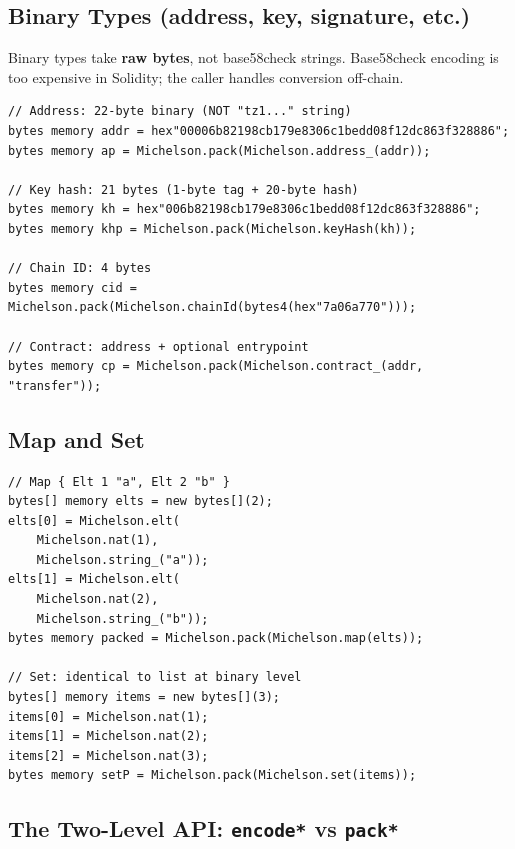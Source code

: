 \documentclass[11pt,a4paper]{article}
\begin{document}
\subsection{Binary Types (address, key, signature, etc.)}

Binary types take \textbf{raw bytes}, not base58check strings. Base58check
encoding is too expensive in Solidity; the caller handles conversion off-chain.

\begin{codebox}
\begin{lstlisting}[language=Solidity]
// Address: 22-byte binary (NOT "tz1..." string)
bytes memory addr = hex"00006b82198cb179e8306c1bedd08f12dc863f328886";
bytes memory ap = Michelson.pack(Michelson.address_(addr));

// Key hash: 21 bytes (1-byte tag + 20-byte hash)
bytes memory kh = hex"006b82198cb179e8306c1bedd08f12dc863f328886";
bytes memory khp = Michelson.pack(Michelson.keyHash(kh));

// Chain ID: 4 bytes
bytes memory cid = Michelson.pack(Michelson.chainId(bytes4(hex"7a06a770")));

// Contract: address + optional entrypoint
bytes memory cp = Michelson.pack(Michelson.contract_(addr, "transfer"));
\end{lstlisting}
\end{codebox}

\subsection{Map and Set}

\begin{codebox}
\begin{lstlisting}[language=Solidity]
// Map { Elt 1 "a", Elt 2 "b" }
bytes[] memory elts = new bytes[](2);
elts[0] = Michelson.elt(
    Michelson.nat(1),
    Michelson.string_("a"));
elts[1] = Michelson.elt(
    Michelson.nat(2),
    Michelson.string_("b"));
bytes memory packed = Michelson.pack(Michelson.map(elts));

// Set: identical to list at binary level
bytes[] memory items = new bytes[](3);
items[0] = Michelson.nat(1);
items[1] = Michelson.nat(2);
items[2] = Michelson.nat(3);
bytes memory setP = Michelson.pack(Michelson.set(items));
\end{lstlisting}
\end{codebox}

\subsection{The Two-Level API: \texttt{encode*} vs \texttt{pack*}}
\end{document}
